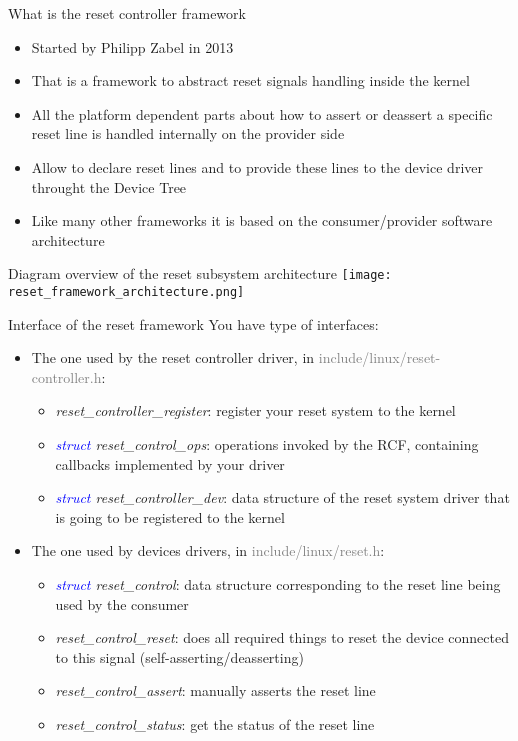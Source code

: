 \documentclass{beamer}
\begin{document}
\begin{frame}{What is the reset controller framework}
	\begin{itemize}
		\item Started by Philipp Zabel in 2013
		\item That is a framework to abstract reset signals handling inside the kernel
		\item All the platform dependent parts about how to assert or deassert a specific reset line is handled internally on the provider side
		\item Allow to declare reset lines and to provide these lines to the device driver throught the Device Tree
		\item Like many other frameworks it is based on the consumer/provider software architecture
	\end{itemize}
\end{frame}

\begin{frame}{Diagram overview of the reset subsystem architecture}
	\centering
	\texttt{[image: reset\_framework\_architecture.png]}
\end{frame}

\begin{frame}{Interface of the reset framework}
	You have type of interfaces:
	\begin{itemize}
		\item The one used by the reset controller driver, in \textcolor{gray}{include/linux/reset-controller.h}:
			\begin{itemize}
				\item \textit{reset\_controller\_register}: register your reset system to the kernel
				\item \textit{\textcolor{blue}{struct} reset\_control\_ops}: operations invoked by the RCF, containing callbacks implemented by your driver
				\item \textit{\textcolor{blue}{struct} reset\_controller\_dev}: data structure of the reset system driver that is going to be registered to the kernel
			\end{itemize}
	\end{itemize}
	\begin{itemize}
		\item The one used by devices drivers, in \textcolor{gray}{include/linux/reset.h}:
			\begin{itemize}
				\item \textit{\textcolor{blue}{struct} reset\_control}: data structure corresponding to the reset line being used by the consumer
				\item \textit{reset\_control\_reset}: does all required things to reset the device connected to this signal (self-asserting/deasserting)
				\item \textit{reset\_control\_assert}: manually asserts the reset line
				\item \textit{reset\_control\_status}: get the status of the reset line
			\end{itemize}
	\end{itemize}
\end{frame}
\end{document}
